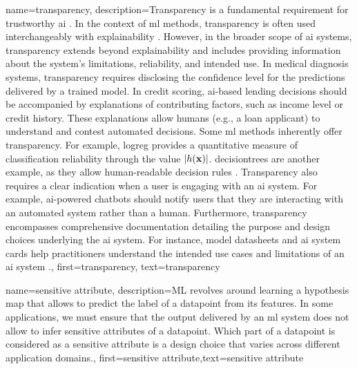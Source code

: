 {name={transparency},
	description={Transparency is a fundamental requirement for 
		trustworthy \gls{ai} \cite{HLEGTrustworhtyAI}. In the context of \gls{ml} 
		methods, transparency is often used interchangeably with \gls{explainability} 
		\cite{gallese2023ai,JunXML2020}. However, in the broader scope of \gls{ai} 
		systems, transparency extends beyond explainability and includes providing information 
		about the system’s limitations, reliability, and intended use. 
		In medical diagnosis systems, transparency requires disclosing the confidence level 
		for the \gls{prediction}s delivered by a trained \gls{model}. In credit scoring, 
		\gls{ai}-based lending decisions should be accompanied by explanations of 
		contributing factors, such as income level or credit history. These explanations 
		allow humans (e.g., a loan applicant) to understand and contest automated decisions. 
		Some \gls{ml} methods inherently offer transparency. For example, \gls{logreg} 
		provides a quantitative measure of classification reliability through the value $|h({\bf x})|$. 
		\Gls{decisiontree}s are another example, as they allow human-readable decision rules \cite{rudin2019stop}.
		Transparency also requires a clear indication when a user is engaging with an \gls{ai} system. 
		For example, \gls{ai}-powered chatbots should notify users that they are interacting with an 
		automated system rather than a human. Furthermore, transparency encompasses comprehensive 
		documentation detailing the purpose and design choices underlying the \gls{ai} system. 
		For instance, \gls{model} datasheets \cite{DatasheetData2021} and \gls{ai} system cards \cite{10.1145/3287560.3287596} 
		help practitioners understand the intended use cases and limitations of an \gls{ai} system \cite{Shahriari2017}.},
	first={transparency}, text={transparency} 
}



{name={sensitive attribute},
	description={ML revolves around learning a \gls{hypothesis} map that allows 
		to predict the \gls{label} of a \gls{datapoint} from its \gls{feature}s. In some 
		applications, we must ensure that the output delivered by an \gls{ml} system does 
		not allow to infer sensitive attributes of a \gls{datapoint}. Which part 
		of a \gls{datapoint} is considered as a sensitive attribute is a design 
		choice that varies across different application domains.},
	first={sensitive attribute},text={sensitive attribute} 
}


